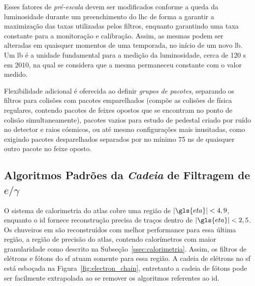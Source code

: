 
Esses fatores de \emph{pré-escala} devem ser modificados conforme a queda da
luminosidade durante um preenchimento do \gls{lhc} de forma a garantir a
maximização das taxas utilizadas pelos filtros, enquanto garantindo uma taxa
constante para a monitoração e calibração. Assim, as mesmas podem ser alteradas
em quaisquer momentos de uma temporada, no início de um novo \gls{lb}. Um
\gls{lb} é a unidade fundamental para a medição da luminosidade, cerca de 120 s
em 2010, na qual se considera que a mesma permaneceu constante com o valor
medido.

Flexibilidade adicional é oferecida ao definir \emph{grupos de pacotes}, separando os
filtros para colisões com pacotes emparelhados (compõe as colisões de física
regulares, contendo pacotes de feixes opostos que se encontram no ponto de
colisão simultaneamente), pacotes vazios para estudo de pedestal criado por ruído 
no detector e raios cósmicos, ou até mesmo configurações mais inusitadas, como 
exigindo pacotes desparelhados separados por no mínimo 75 ns de quaisquer outro 
pacote no feixe oposto.



\subsection[Algoritmos Padrões da \emph{Cadeia} de Filtragem de eGamma]{Algoritmos Padrões da \emph{Cadeia} de Filtragem de $e/\gamma$}
\label{ssec:cadeia_egamma}


O sistema de calorimetria do \gls{atlas} cobre uma região de $|\gls{eta}| <
4,9$, enquanto o \gls{id} fornece reconstrução precisa de traços dentro de
$|\gls{eta}| < 2,5$. Os chuveiros \gls{em} são reconstruídos com melhor
performance para essa última região, a região de precisão do \gls{atlas}, 
contendo calorímetros com maior granularidade como descrito na
Subseção~\ref{ssec:calorimetria}. Assim, os filtros de elétrons e fótons
\cite{expected_perf_2011,perf_2011} do \gls{sf} atuam somente para essa região.
A cadeia de elétrons no \gls{sf} está esboçada na Figura~\ref{fig:electron_chain}, entretanto
a cadeia de fótons pode ser facilmente extrapolada ao se remover os algoritmos
referentes ao \gls{id}.

